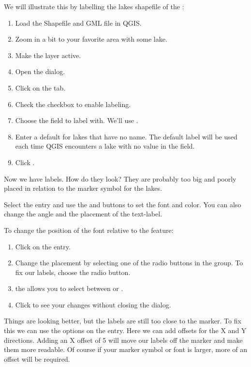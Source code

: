 We will illustrate this by labelling the lakes shapefile of the
:

\begin{enumerate}
\item Load the Shapefile  and GML file  in QGIS.
\item Zoom in a bit to your favorite area with some lake.
\item Make the  layer active.
\item Open the  dialog.
\item Click on the  tab.
\item Check the  checkbox to enable labeling.
\item Choose the field to label with. 
  We'll use .
\item Enter a default for lakes that have no name. The default label will be
  used each time QGIS encounters a lake with no value in the  field.
\item Click .
\end{enumerate} 

Now we have labels. How do they look? They are probably too big and poorly
placed in relation to the marker symbol for the lakes.

Select the  entry and use the  and 
buttons to set the font and color. You can also change the angle and the
placement of the text-label.

To change the position of the font relative to the feature:

\begin{enumerate} 
\item Click on the  entry.
\item Change the placement by selecting one of the radio buttons
in the  group. To fix our labels, choose the
 radio button.
\item the  allows you to select between
 or .
\item Click  to see your changes without closing the dialog.
\end{enumerate} 

Things are looking better, but the labels are still too close to the marker. To
fix this we can use the options on the  entry. Here we can add
offsets for the X and Y directions. Adding an X offset of 5 will move our
labels off the marker and make them more readable. Of course if your marker
symbol or font is larger, more of an offset will be required.

